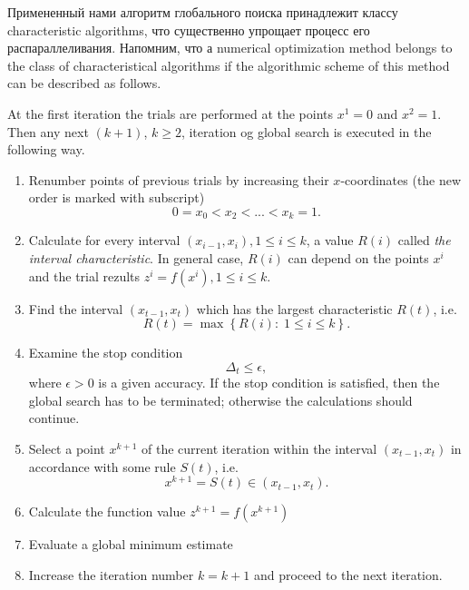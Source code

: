 \documentclass{svproc}
\begin{document}
Примененный нами алгоритм глобального поиска принадлежит классу characteristic algorithms, что существенно упрощает процесс его распараллеливания.
Напомним, что а numerical optimization method belongs to the class of characteristical algorithms if the algorithmic scheme of this method can be described as follows.

At the first iteration the trials are performed at the points $x^1 = 0$ and $x^2 = 1$. Then any next $(k+1)$, $k \geq 2$, iteration og global search is executed in the following way.

\begin{enumerate}
	\item 
Renumber points of previous trials by increasing their $x$-coordinates (the new order is marked with subscript)
\[
0=x_0<x_2<...<x_{k}=1.
\]

	\item 
Calculate for every interval $(x_{i-1},x_i), 1\leq i\leq k$, a value $R(i)$ called \textit{the interval characteristic}. In general case, $R(i)$ can depend on the points $x^i$ and the trial rezults $z^i=f(x^i), 1 \leq i \leq k$.

	\item 
Find the interval $(x_{t-1},x_t)$ which has the largest characteristic $R(t)$, i.e.
\[
R(t) = \max \left\{ R(i): \; 1\leq i\leq k \right\}.
\]

	\item 
Examine the stop condition
\[
\Delta_t \leq \epsilon ,
\]
where $\epsilon>0$ is a given accuracy. If the stop condition is satisfied, then the global search has to be terminated; otherwise the calculations should continue.

	\item 
Select a point $x^{k+1}$ of the current iteration within the interval $(x_{t-1},x_t)$ in accordance with some rule $S(t)$, i.e.
\[
x^{k+1} = S(t)\in(x_{t-1},x_t).
\]
	
	\item 
Calculate the function value $z^{k+1} = f(x^{k+1})$

	\item 
Evaluate a global minimum estimate 

	\item 
Increase the iteration number $k=k+1$ and proceed to the next iteration.
\end{enumerate}
\end{document}
